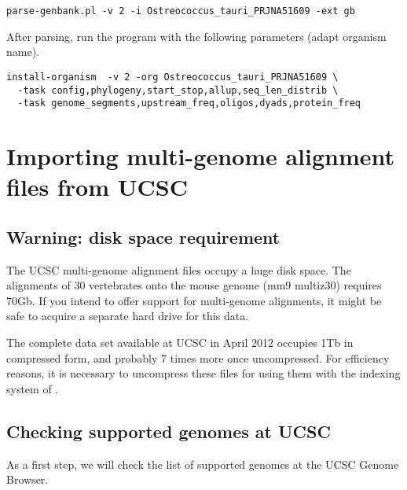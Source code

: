 \begin{enumerate}
\begin{lstlisting}
parse-genbank.pl -v 2 -i Ostreococcus_tauri_PRJNA51609 -ext gb
\end{lstlisting}

After parsing, run the program  with the
following parameters (adapt organism name).

\begin{lstlisting}
install-organism  -v 2 -org Ostreococcus_tauri_PRJNA51609 \
  -task config,phylogeny,start_stop,allup,seq_len_distrib \
  -task genome_segments,upstream_freq,oligos,dyads,protein_freq
\end{lstlisting}


\end{enumerate}


\section{Importing multi-genome alignment files from UCSC}


\subsection{Warning: disk space requirement}

The UCSC multi-genome alignment files occupy a huge disk space. The
alignments of 30 vertebrates onto the mouse genome (mm9 multiz30)
requires 70Gb. If you intend to offer support for multi-genome
alignments, it might be safe to acquire a separate hard drive for this
data.

The complete data set available at UCSC in April 2012 occupies 1Tb in
compressed form, and probably 7 times more once uncompressed. For
efficiency reasons, it is necessary to uncompress these files for
using them with the indexing system of \program{peak-footprints}.

\subsection{Checking supported genomes at UCSC}

As a first step, we will check the list of supported genomes at the
UCSC Genome Browser.

